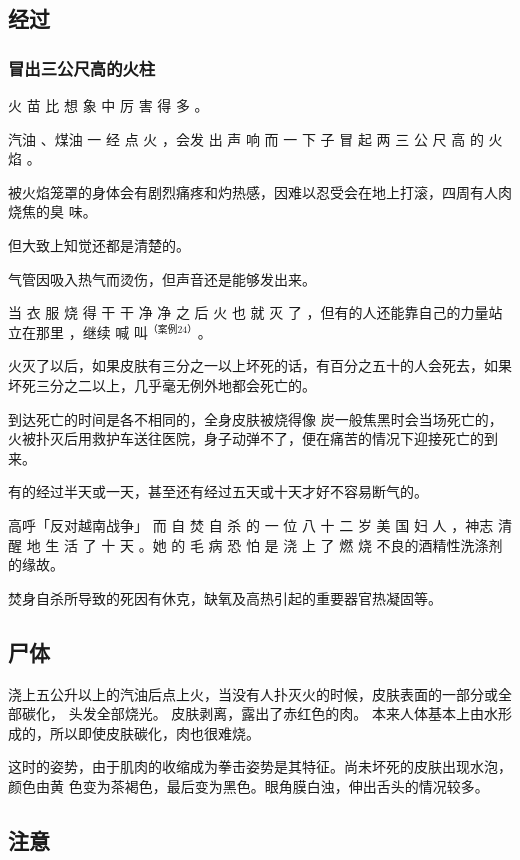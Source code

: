 \documentclass[UTF8]{ctexart}
\begin{document}
\subsection{经过}

\subsubsection*{冒出三公尺高的火柱}


火 苗 比 想 象 中 厉 害 得 多 。

汽油 、煤油 一 经 点 火 ，会发 出 声 响 而 一 下 子 冒 起 两 三 公 尺 高 的 火 焰 。

被火焰笼罩的身体会有剧烈痛疼和灼热感，因难以忍受会在地上打滚，四周有人肉烧焦的臭 味。

但大致上知觉还都是清楚的。

气管因吸入热气而烫伤，但声音还是能够发出来。 

当 衣 服 烧 得 干 干 净 净 之 后 火 也 就 灭 了 ，但有的人还能靠自己的力量站立在那里 ，继续 喊 叫$^{（ 案例 24）}$。 

火灭了以后，如果皮肤有三分之一以上坏死的话，有百分之五十的人会死去，如果坏死三分之二以上，几乎毫无例外地都会死亡的。

到达死亡的时间是各不相同的，全身皮肤被烧得像 炭一般焦黑时会当场死亡的，火被扑灭后用救护车送往医院，身子动弹不了，便在痛苦的情况下迎接死亡的到来。

有的经过半天或一天，甚至还有经过五天或十天才好不容易断气的。

高呼「反对越南战争」 而 自 焚 自 杀 的 一 位 八 十 二 岁 美 国 妇 人 ，神志 清 醒 地 生 活 了 十 天 。她 的 毛 病 恐 怕 是 浇 上 了 燃 烧 不良的酒精性洗涤剂的缘故。 

焚身自杀所导致的死因有休克，缺氧及高热引起的重要器官热凝固等。


\subsection{尸体}

浇上五公升以上的汽油后点上火，当没有人扑灭火的时候，皮肤表面的一部分或全部碳化，
头发全部烧光。
皮肤剥离，露出了赤红色的肉。
本来人体基本上由水形成的，所以即使皮肤碳化，肉也很难烧。

这时的姿势，由于肌肉的收缩成为拳击姿势是其特征。尚未坏死的皮肤出现水泡，颜色由黄
色变为茶褐色，最后变为黑色。眼角膜白浊，伸出舌头的情况较多。


\subsection{注意}
\end{document}
